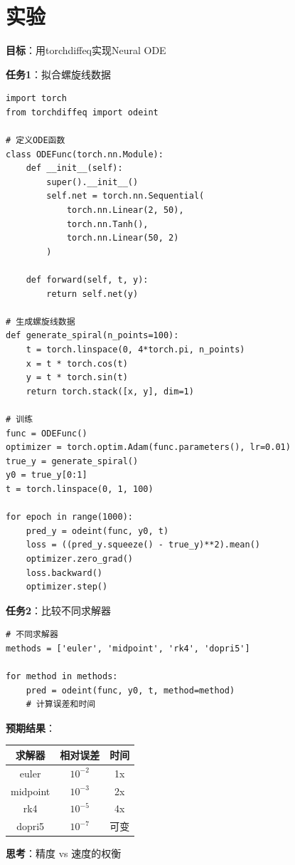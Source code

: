 \documentclass[12pt, a4paper]{ctexart}
\begin{document}
\section{实验}

\begin{experiment}

\textbf{目标}：用torchdiffeq实现Neural ODE

\textbf{任务1}：拟合螺旋线数据

\begin{lstlisting}
import torch
from torchdiffeq import odeint

# 定义ODE函数
class ODEFunc(torch.nn.Module):
    def __init__(self):
        super().__init__()
        self.net = torch.nn.Sequential(
            torch.nn.Linear(2, 50),
            torch.nn.Tanh(),
            torch.nn.Linear(50, 2)
        )
    
    def forward(self, t, y):
        return self.net(y)

# 生成螺旋线数据
def generate_spiral(n_points=100):
    t = torch.linspace(0, 4*torch.pi, n_points)
    x = t * torch.cos(t)
    y = t * torch.sin(t)
    return torch.stack([x, y], dim=1)

# 训练
func = ODEFunc()
optimizer = torch.optim.Adam(func.parameters(), lr=0.01)
true_y = generate_spiral()
y0 = true_y[0:1]
t = torch.linspace(0, 1, 100)

for epoch in range(1000):
    pred_y = odeint(func, y0, t)
    loss = ((pred_y.squeeze() - true_y)**2).mean()
    optimizer.zero_grad()
    loss.backward()
    optimizer.step()
\end{lstlisting}

\end{experiment}

\begin{experiment}[实验10a续：分析结果]

\textbf{任务2}：比较不同求解器

\begin{lstlisting}
# 不同求解器
methods = ['euler', 'midpoint', 'rk4', 'dopri5']

for method in methods:
    pred = odeint(func, y0, t, method=method)
    # 计算误差和时间
\end{lstlisting}

\textbf{预期结果}：

\begin{center}
\begin{tabular}{c|c|c}
求解器 & 相对误差 & 时间 \\
\hline
euler & $10^{-2}$ & 1x \\
midpoint & $10^{-3}$ & 2x \\
rk4 & $10^{-5}$ & 4x \\
dopri5 & $10^{-7}$ & 可变
\end{tabular}
\end{center}

\textbf{思考}：精度 vs 速度的权衡

\end{experiment}
\end{document}
